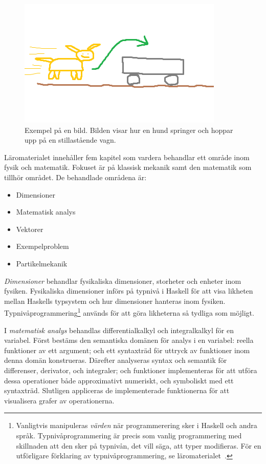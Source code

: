 
\begin{figure}[h]
        \centering
        \includegraphics[width=0.4\linewidth]{figure/smakprov_bild_laromaterial.png}
        \caption{Exempel på en bild. Bilden visar hur en hund springer och hoppar upp på en stillastående vagn.}
        \label{fig:smakprov_bild_laromaterial}
\end{figure}

Läromaterialet innehåller fem kapitel som vardera behandlar ett område inom fysik
och matematik. Fokuset är på klassisk mekanik samt den matematik som tillhör
området. De behandlade områdena är:

\begin{itemize}
  \item Dimensioner
  \item Matematisk analys
  \item Vektorer
  \item Exempelproblem
  \item Partikelmekanik
\end{itemize}

\textit{Dimensioner} behandlar fysikaliska dimensioner, storheter och enheter inom fysiken.
Fysikaliska dimensioner införs på typnivå i Haskell för att visa likheten mellan
Haskells typsystem och hur dimensioner hanteras inom fysiken.
Typnivåprogrammering\footnote{Vanligtvis manipuleras \textit{värden} när
programmerering sker i Haskell och andra språk. Typnivåprogrammering är precis som
vanlig programmering med skillnaden att den sker på typnivån, det vill säga, att
typer modifieras. För en utförligare förklaring av typnivåprogrammering, se läromaterialet~\cite{LYAP}.} används för att göra likheterna så tydliga som möjligt.

I \textit{matematisk analys} behandlas differentialkalkyl och
integralkalkyl för en variabel. Först bestäms den semantiska domänen
för analys i en variabel: reella funktioner av ett argument; och ett syntaxträd
för uttryck av funktioner inom denna domän konstrueras. Därefter
analyseras syntax och semantik för differenser, derivator, och
integraler; och funktioner implementeras för att utföra dessa
operationer både approximativt numeriskt, och symboliskt med ett
syntaxträd. Slutligen appliceras de implementerade funktionerna för
att visualisera grafer av operationerna.

